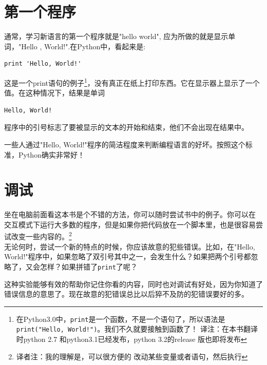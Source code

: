 \section{第一个程序}
\label{hello}

通常，学习新语言的第一个程序就是"hello world", 应为所做的就是显示单词，"Hello , World!".在Python中，看起来是:

\beforeverb
\begin{verbatim}
print 'Hello, World!'
\end{verbatim}
\afterverb

这是一个print语句的例子\footnote{在Python3.0中，{\tt print}是一个函数，不是一个语句了，所以语法是{\tt print("Hello, World!")}。我们不久就要接触到函数了！  译注：在本书翻译时python 2.7 和python3.1已经发布，python 3.2的release 版也即将发布}，没有真正在纸上打印东西。它在显示器上显示了一个值。在这种情况下，结果是单词


\beforeverb
\begin{verbatim}
Hello, World!
\end{verbatim}
\afterverb

程序中的引号标志了要被显示的文本的开始和结束，他们不会出现在结果中。


一些人通过"Hello, World!"程序的简洁程度来判断编程语言的好坏。按照这个标准，Python确实非常好！


\section{调试}

坐在电脑前面看这本书是个不错的方法，你可以随时尝试书中的例子。你可以在
交互模式下运行大多数的程序，但是如果你把代码放在一个脚本里，也是很容易尝试改变一些内容的。\footnote{译者注：我的理解是，可以很方便的
改动某些变量或者语句，然后执行}\\

无论何时，尝试一个新的特点的时候，你应该故意的犯些错误。比如，在"Hello, World!"程序中，如果忽略了双引号其中之一，会发生什么？如果把两个引号都忽略了，又会怎样？如果拼错了{\tt print}了呢？\\


这种实验能够有效的帮助你记住你看的内容，同时也对调试有好处，因为你知道了错误信息的意思了。现在故意的犯错误总比以后猝不及防的犯错误要好的多。\\

